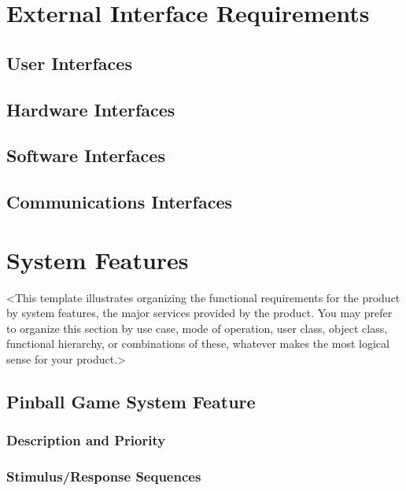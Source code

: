 \documentclass[11pt]{article}
\begin{document}
\section{External Interface Requirements}
\label{sec:orgbd650fa}
\subsection{User Interfaces}
\label{sec:org446d108}
\subsection{Hardware Interfaces}
\label{sec:orgf455400}
\subsection{Software Interfaces}
\label{sec:orgc6fd35f}
\subsection{Communications Interfaces}
\label{sec:orgaa9b77b}
\section{System Features}
\label{sec:orgaa9de0d}
<This template illustrates organizing the functional requirements for the product by system
features, the major services provided by the product. You may prefer to organize this section by
use case, mode of operation, user class, object class, functional hierarchy, or combinations of
these, whatever makes the most logical sense for your product.>
\subsection{Pinball Game System Feature}
\label{sec:org08a89ad}
\subsubsection{Description and Priority}
\label{sec:orgdd0428d}
\subsubsection{Stimulus/Response Sequences}
\label{sec:org5e7248f}
\end{document}
